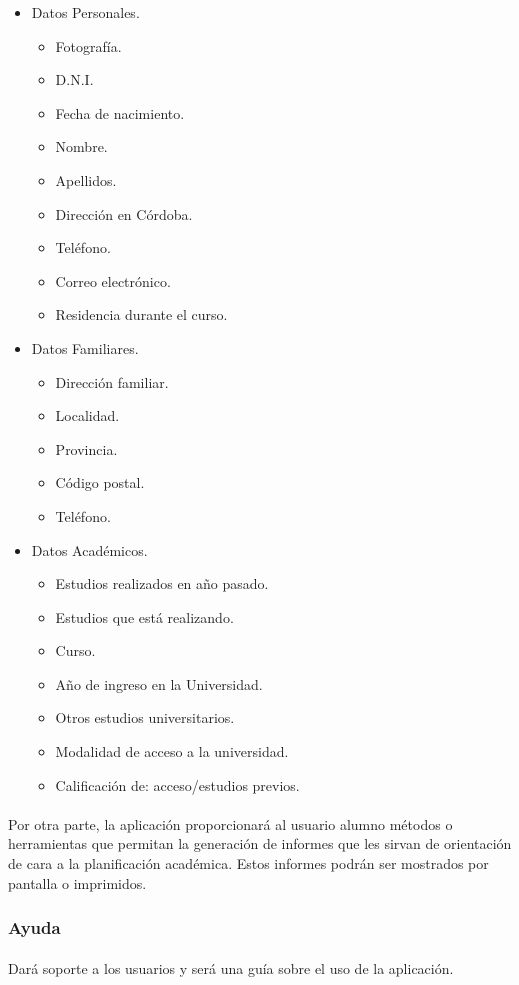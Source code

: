       \begin{itemize}
         \item Datos Personales.
         \begin{itemize}
            \item Fotografía.
            \item D.N.I.
            \item Fecha de nacimiento.
            \item Nombre.
            \item Apellidos.
            \item Dirección en Córdoba.
            \item Teléfono.
            \item Correo electrónico.
            \item Residencia durante el curso.
         \end{itemize}
         \item Datos Familiares.
         \begin{itemize}
            \item Dirección familiar.
            \item Localidad.
            \item Provincia.
            \item Código postal.
            \item Teléfono.
         \end{itemize}
         \item Datos Académicos.
         \begin{itemize}
            \item Estudios realizados en año pasado.
            \item Estudios que está realizando.
            \item Curso.
            \item Año de ingreso en la Universidad.
            \item Otros estudios universitarios.
            \item Modalidad de acceso a la universidad.
            \item Calificación de: acceso/estudios previos.
         \end{itemize}
      \end{itemize}

      \paragraph{}Por otra parte, la aplicación proporcionará al usuario alumno
      métodos o herramientas que permitan la generación de informes que les
      sirvan de orientación de cara a la planificación académica. Estos informes
      podrán ser mostrados por pantalla o imprimidos.

      \subsubsection{Ayuda}

      \paragraph{}Dará soporte a los usuarios y será una guía sobre el uso de
      la aplicación.